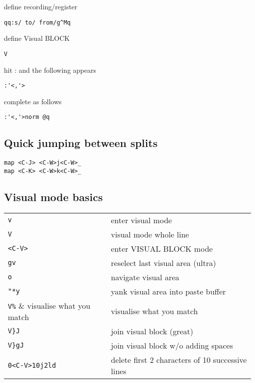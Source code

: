 define recording/register
\begin{verbatim}
qq:s/ to/ from/g^Mq
\end{verbatim}

define Visual BLOCK
\begin{verbatim}
V
\end{verbatim}

hit : and the following appears
\begin{verbatim}
:'<,'>
\end{verbatim}

complete as follows
\begin{verbatim}
:'<,'>norm @q
\end{verbatim}

\subsection{Quick jumping between splits}

\begin{verbatim}
map <C-J> <C-W>j<C-W>_
map <C-K> <C-W>k<C-W>_
\end{verbatim}

\subsection{Visual mode basics}
\begin{center}
\begin{longtable}{l|l}
\verb!v! & enter visual mode\\
\verb!V! & visual mode whole line\\
\verb!<C-V>! & enter VISUAL BLOCK mode\\
\verb!gv! & reselect last visual area (ultra)\\
\verb!o! & navigate visual area\\
\verb!"*y! & yank visual area into paste buffer\\
\verb!V%! & visualise what you match\\
\verb!V}J! & join visual block (great)\\
\verb!V}gJ! & join visual block w/o adding spaces\\
\verb!0<C-V>10j2ld! & delete first 2 characters of 10 successive lines
\end{longtable}
\end{center}

